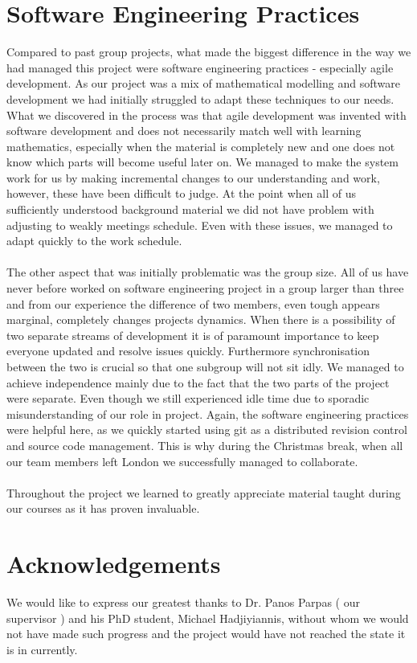 \documentclass[10pt, a4paper]{report}
\begin{document}
\section{Software Engineering Practices}\label{sec:softeng}
Compared to past group projects, what made the biggest difference in the way we had managed this project were software engineering practices - especially agile development. As our project was a mix of mathematical modelling and software development we had initially struggled to adapt these techniques to our needs. What we discovered in the process was that agile development was invented with software development and does not necessarily match well with learning mathematics, especially when the material is completely new and one does not know which parts will become useful later on. We managed to make the system work for us by making incremental changes to our understanding and work, however, these have been difficult to judge. At the point when all of us sufficiently understood background material we did not have problem with adjusting to weakly meetings schedule. Even with these issues, we managed to adapt quickly to the work schedule.
\\\\
The other aspect that was initially problematic was the group size. All of us have never before worked on software engineering project in a group larger than three and from our experience the difference of two members, even tough appears marginal, completely changes projects dynamics. When there is a possibility of two separate streams of development it is of paramount importance to keep everyone updated and resolve issues quickly. Furthermore synchronisation between the two is crucial so that one subgroup will not sit idly. We managed to achieve independence mainly due to the fact that the two parts of the project were separate. Even though we still experienced idle time due to sporadic misunderstanding of our role in project. Again, the software engineering practices were helpful here, as we quickly started  using git as a distributed revision control and source code management. This is why during the Christmas break, when all our team members left London we  successfully managed to collaborate.
\\\\
Throughout the project we learned to greatly appreciate material taught during our courses as it has proven invaluable.

\section{Acknowledgements}\label{sec:ack}
We would like to express our greatest thanks to Dr. Panos Parpas ( our supervisor ) and his PhD student, Michael Hadjiyiannis, without whom we would not have made such progress and the project would have not reached the state it is in currently.



\end{document}
